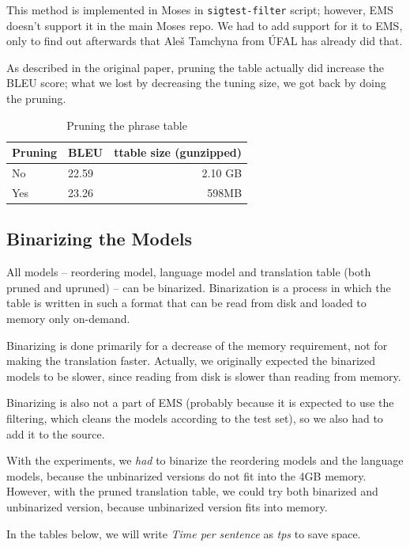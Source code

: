 This method is implemented in Moses in \texttt{sigtest-filter} script; however, EMS doesn't support it in the main Moses repo. We had to add support for it to EMS, only to find out afterwards that Aleš Tamchyna from ÚFAL has already did that.

As described in the original paper, pruning the table actually did increase the BLEU score; what we lost by decreasing the tuning size, we got back by doing the pruning.

\begin{table}[h]
\begin{center}
\begin{tabular}{|l|l|r|}
    \hline
    \textbf{Pruning} & \textbf{BLEU} & \textbf{ttable size (gunzipped)} \\ \hline
    No & 22.59 & 2.10 GB \\ \hline
    Yes & 23.26 & 598MB \\  \hline
\end{tabular}
\end{center}

\caption{Pruning the phrase table}\label{moses:tablepruning}
\end{table}

\subsection{Binarizing the Models}
All models -- reordering model, language model and translation table (both pruned and upruned) -- can be binarized. Binarization is a process in which the table is written in such a format that can be read from disk and loaded to memory only on-demand.

Binarizing is done primarily for a decrease of the memory requirement, not for making the translation faster. Actually, we originally expected the binarized models to be slower, since  reading from disk  is slower than reading from memory.

Binarizing is also not a part of EMS (probably because it is expected to use the filtering, which cleans the models according to the test set), so we also had to add it to the source.

With the experiments, we \emph{had} to binarize the reordering models and the language models, because the unbinarized versions do not fit into the 4GB memory. However, with the pruned translation table, we could try both binarized and unbinarized version, because unbinarized version fits into memory.

In the tables below, we will write \emph{Time per sentence} as \emph{tps} to save space.

